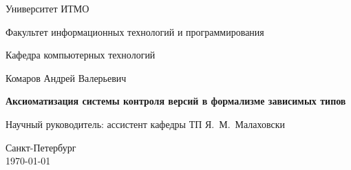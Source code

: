 \documentclass[a4paper]{report}
\theoremstyle{plain}
\theoremstyle{definition}
\begin{document}
\pagestyle{title}

\begin{center}
  Университет ИТМО \\
  \hrulefill
 
\vspace{2cm}

Факультет информационных технологий и программирования

Кафедра компьютерных технологий

\vspace{3cm}

{\Large Комаров Андрей Валерьевич}

\vspace{2cm}

\vbox{\LARGE\bfseries Аксиоматизация системы контроля версий в
  формализме зависимых типов }

\vspace{4cm}

{\Large Научный руководитель: ассистент кафедры ТП Я.~М.~Малаховски}

\vspace{6cm}

Санкт-Петербург\\ \today
\end{center}


\newpage
\pagestyle{plain}

\tableofcontents

\startthechapters



%


\printbibliography
\end{document}
